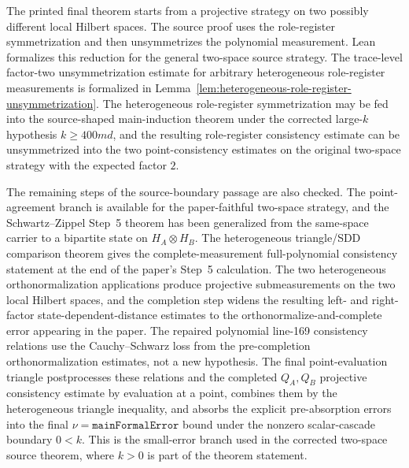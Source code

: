 \begin{proposition}\label{prop:main-formal-source-two-space-role-register}
	\leanok
	The printed final theorem starts from a projective strategy on two possibly
	different local Hilbert spaces.  The source proof uses the role-register
	symmetrization and then unsymmetrizes the polynomial measurement.  Lean
	formalizes this reduction for the general two-space source strategy.  The
	trace-level factor-two unsymmetrization estimate for arbitrary heterogeneous
	role-register measurements is formalized in
	Lemma~\ref{lem:heterogeneous-role-register-unsymmetrization}.  The
	heterogeneous role-register symmetrization may be fed into the source-shaped
	main-induction theorem under the corrected large-\(k\) hypothesis
	\(k\ge 400md\), and the resulting role-register consistency estimate can be
	unsymmetrized into the two point-consistency estimates on the original
	two-space strategy with the expected factor \(2\).

	The remaining steps of the source-boundary passage are also checked.  The
	point-agreement branch is available for the paper-faithful two-space
	strategy, and the Schwartz--Zippel Step~5 theorem has been generalized from
	the same-space carrier to a bipartite state on \(H_A\otimes H_B\).  The
	heterogeneous triangle/SDD comparison theorem gives the complete-measurement
	full-polynomial consistency statement at the end of the paper's Step~5
	calculation.  The two heterogeneous orthonormalization applications produce
	projective submeasurements on the two local Hilbert spaces, and the completion
	step widens the resulting left- and right-factor state-dependent-distance
	estimates to the orthonormalize-and-complete error appearing in the paper.
	The repaired polynomial line-169 consistency relations use the
	Cauchy--Schwarz loss from the pre-completion orthonormalization estimates,
	not a new hypothesis.  The final point-evaluation triangle postprocesses
	these relations and the completed \(Q_A,Q_B\) projective consistency estimate
	by evaluation at a point, combines them by the heterogeneous triangle
	inequality, and absorbs the explicit pre-absorption errors into the final
	\(\nu=\texttt{mainFormalError}\) bound under the nonzero scalar-cascade
	boundary \(0<k\).  This is the small-error branch used in the corrected
	two-space source theorem, where \(k>0\) is part of the theorem statement.
\end{proposition}
